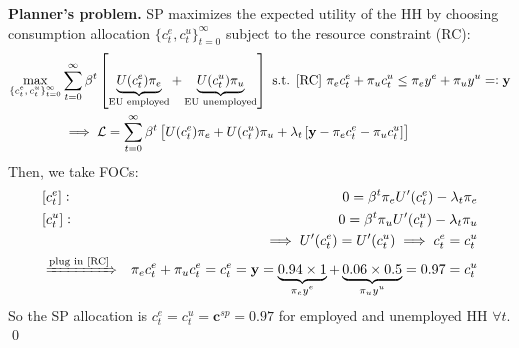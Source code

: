 \begin{solution}
    \par \noindent \colorbox{black!12}{\textbf{Planner's problem.}} SP maximizes the expected utility of the HH
    by choosing consumption allocation $\{c_t^e, c_t^u\}_{t=0}^{\infty}$ subject to the resource constraint (RC):
    \begin{eqnarray}
        \max\limits_{\text{\scriptsize $\{c_t^e, c_t^u\}_{t=0}^{\infty}$}} & \displaystyle\sum_{t=0}^{\infty} \beta^t \left[ \underbrace{U(c_t^e) \pi_e}_{\text{\scriptsize EU employed}}
            + \underbrace{U(c_t^u) \pi_u}_{\text{\scriptsize EU unemployed}} \right]
        \text{ s.t. } \text{[RC] }\pi_e c_t^e + \pi_u c_t^u \leq \pi_e y^e + \pi_u y^u =: \mathbf{y} \\
        & \implies \mathcal{L} =\displaystyle\sum_{t=0}^{\infty} \beta^t \left[ U(c_t^e) \pi_e + U(c_t^u) \pi_u
            + \lambda_t \left[\mathbf{y} - \pi_e c_t^e - \pi_u c_t^u \right] \right]
    \end{eqnarray} Then, we take FOCs:
    \begin{eqnarray}
        & [c_t^e]: & 0 = \beta^t \pi_e U'(c_t^e) - \lambda_t \pi_e  \\
        & [c_t^u]: & 0 = \beta^t \pi_u U'(c_t^u) - \lambda_t \pi_u  \\
        & & \implies U'(c_t^e) = U'(c_t^u) \implies c_t^e = c_t^u \\
        & \xRightarrow{\text{\scriptsize plug in [RC]}} & \pi_e c_t^e + \pi_u c_t^e = c_t^e = \mathbf{y} = \underbrace{0.94 \times 1}_{\text{\scriptsize $\pi_e y^e$}}
        + \underbrace{0.06 \times 0.5}_{\text{\scriptsize $\pi_u y^u$}} = 0.97 = c_t^u
    \end{eqnarray}
    So the SP allocation is \colorbox{black!12}{$c_t^e = c_t^u = \mathbf{c}^{sp} = 0.97$} for employed and unemployed HH $\forall t$. \qed \\[2pt]


\end{solution}
